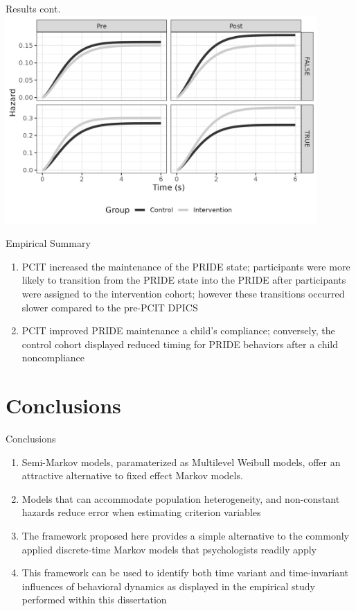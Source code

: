 \documentclass[
  ignorenonframetext,
]{beamer}
\providecommand{\tightlist}{%
  \setlength{\itemsep}{0pt}\setlength{\parskip}{0pt}}
\begin{document}
\begin{frame}{Results cont.}
\label{results-cont.-2}
\includegraphics[width=\textwidth,height=3.125in]{figures/complyHazOnetoOne.png}
\end{frame}

\begin{frame}{Empirical Summary}
\label{empirical-summary}
\begin{enumerate}
\item
  PCIT increased the maintenance of the PRIDE state; participants were
  more likely to transition from the PRIDE state into the PRIDE after
  participants were assigned to the intervention cohort; however these
  transitions occurred slower compared to the pre-PCIT DPICS
\item
  PCIT improved PRIDE maintenance a child's compliance; conversely, the
  control cohort displayed reduced timing for PRIDE behaviors after a
  child noncompliance
\end{enumerate}
\end{frame}

\section{Conclusions}\label{conclusions}

\begin{frame}{Conclusions}
\begin{enumerate}
\tightlist
\item
  Semi-Markov models, paramaterized as Multilevel Weibull models, offer
  an attractive alternative to fixed effect Markov models.
\item
  Models that can accommodate population heterogeneity, and non-constant
  hazards reduce error when estimating criterion variables
\item
  The framework proposed here provides a simple alternative to the
  commonly applied discrete-time Markov models that psychologists
  readily apply
\item
  This framework can be used to identify both time variant and
  time-invariant influences of behavioral dynamics as displayed in the
  empirical study performed within this dissertation
\end{enumerate}
\end{frame}
\end{document}
